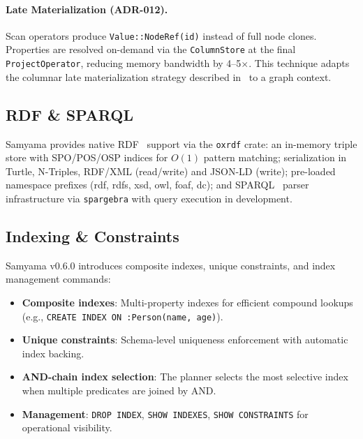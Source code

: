 \documentclass[11pt]{article}
\begin{document}
\paragraph{Late Materialization (ADR-012).}
Scan operators produce \texttt{Value::NodeRef(id)} instead of full node clones. Properties are resolved on-demand via the \texttt{ColumnStore} at the final \texttt{ProjectOperator}, reducing memory bandwidth by 4--5$\times$. This technique adapts the columnar late materialization strategy described in~\citet{abadi2008column} to a graph context.

\subsection{RDF \& SPARQL}

Samyama provides native RDF~\citep{w3c2014rdf} support via the \texttt{oxrdf} crate: an in-memory triple store with SPO/POS/OSP indices for $O(1)$ pattern matching; serialization in Turtle, N-Triples, RDF/XML (read/write) and JSON-LD (write); pre-loaded namespace prefixes (rdf, rdfs, xsd, owl, foaf, dc); and SPARQL~\citep{w3c2013sparql} parser infrastructure via \texttt{spargebra} with query execution in development.

\subsection{Indexing \& Constraints}
\label{sec:indexing}

Samyama v0.6.0 introduces composite indexes, unique constraints, and index management commands:

\begin{itemize}[leftmargin=*]
  \item \textbf{Composite indexes}: Multi-property indexes for efficient compound lookups (e.g., \texttt{CREATE INDEX ON :Person(name, age)}).
  \item \textbf{Unique constraints}: Schema-level uniqueness enforcement with automatic index backing.
  \item \textbf{AND-chain index selection}: The planner selects the most selective index when multiple predicates are joined by AND.
  \item \textbf{Management}: \texttt{DROP INDEX}, \texttt{SHOW INDEXES}, \texttt{SHOW CONSTRAINTS} for operational visibility.
\end{itemize}

\end{document}
